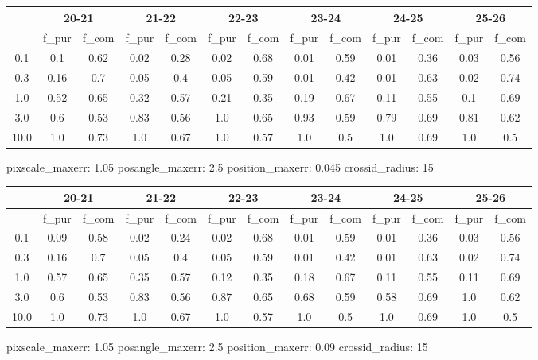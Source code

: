 \documentclass{article}
\begin{document}
\begin{figure}[H]
\centering
\begin{tabular}{|c|c|c|c|c|c|c|c|c|c|c|c|c|}
\hline
\multicolumn{1}{|c|}{} & \multicolumn{2}{|c|}{20-21} & \multicolumn{2}{|c|}{21-22} & \multicolumn{2}{|c|}{22-23} & \multicolumn{2}{|c|}{23-24} & \multicolumn{2}{|c|}{24-25} & \multicolumn{2}{|c|}{25-26}\\
\hline \hline
 & f\_pur & f\_com & f\_pur & f\_com & f\_pur & f\_com & f\_pur & f\_com & f\_pur & f\_com & f\_pur & f\_com \\
\hline
0.1 & 0.1 & 0.62 & 0.02 & 0.28 & 0.02 & 0.68 & 0.01 & 0.59 & 0.01 & 0.36 & 0.03 & 0.56\\
\hline
0.3 & 0.16 & 0.7 & 0.05 & 0.4 & 0.05 & 0.59 & 0.01 & 0.42 & 0.01 & 0.63 & 0.02 & 0.74\\
\hline
1.0 & 0.52 & 0.65 & 0.32 & 0.57 & 0.21 & 0.35 & 0.19 & 0.67 & 0.11 & 0.55 & 0.1 & 0.69\\
\hline
3.0 & 0.6 & 0.53 & 0.83 & 0.56 & 1.0 & 0.65 & 0.93 & 0.59 & 0.79 & 0.69 & 0.81 & 0.62\\
\hline
10.0 & 1.0 & 0.73 & 1.0 & 0.67 & 1.0 & 0.57 & 1.0 & 0.5 & 1.0 & 0.69 & 1.0 & 0.5\\
\hline
\end{tabular}
\caption{pixscale\_maxerr: 1.05 posangle\_maxerr: 2.5 position\_maxerr: 0.045 crossid\_radius: 15}
\end{figure}

\begin{figure}[H]
\centering
\begin{tabular}{|c|c|c|c|c|c|c|c|c|c|c|c|c|}
\hline
\multicolumn{1}{|c|}{} & \multicolumn{2}{|c|}{20-21} & \multicolumn{2}{|c|}{21-22} & \multicolumn{2}{|c|}{22-23} & \multicolumn{2}{|c|}{23-24} & \multicolumn{2}{|c|}{24-25} & \multicolumn{2}{|c|}{25-26}\\
\hline \hline
 & f\_pur & f\_com & f\_pur & f\_com & f\_pur & f\_com & f\_pur & f\_com & f\_pur & f\_com & f\_pur & f\_com \\
\hline
0.1 & 0.09 & 0.58 & 0.02 & 0.24 & 0.02 & 0.68 & 0.01 & 0.59 & 0.01 & 0.36 & 0.03 & 0.56\\
\hline
0.3 & 0.16 & 0.7 & 0.05 & 0.4 & 0.05 & 0.59 & 0.01 & 0.42 & 0.01 & 0.63 & 0.02 & 0.74\\
\hline
1.0 & 0.57 & 0.65 & 0.35 & 0.57 & 0.12 & 0.35 & 0.18 & 0.67 & 0.11 & 0.55 & 0.11 & 0.69\\
\hline
3.0 & 0.6 & 0.53 & 0.83 & 0.56 & 0.87 & 0.65 & 0.68 & 0.59 & 0.58 & 0.69 & 1.0 & 0.62\\
\hline
10.0 & 1.0 & 0.73 & 1.0 & 0.67 & 1.0 & 0.57 & 1.0 & 0.5 & 1.0 & 0.69 & 1.0 & 0.5\\
\hline
\end{tabular}
\caption{pixscale\_maxerr: 1.05 posangle\_maxerr: 2.5 position\_maxerr: 0.09 crossid\_radius: 15}
\end{figure}
\end{document}
